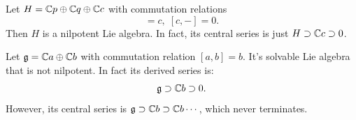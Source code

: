 \begin{dang}
    \begin{example}
        Let $H=\mathbb{C} p\oplus\mathbb{C} q\oplus \mathbb{C} c$ with commutation relations
        \begin{equation}
            [p,q]=c,\;[c,-]=0.
        \end{equation}
        Then $H$ is a nilpotent Lie algebra. In fact, its central series is just $H\supset \mathbb{C} c\supset0$.
    \end{example}
\end{dang}

\begin{dang}
    \begin{example}
        Let $\mathfrak{g}=\mathbb{C} a\oplus\mathbb{C} b$ with commutation relation $[a,b]=b$. It's solvable Lie algebra that is not 
        nilpotent. In fact its derived series is:
        \begin{equation}
            \mathfrak{g}\supset \mathbb{C} b\supset 0.
        \end{equation}
        However, its central series is $\mathfrak{g}\supset \mathbb{C} b\supset \mathbb{C} b\cdots$, which never terminates.
    \end{example}
\end{dang}

